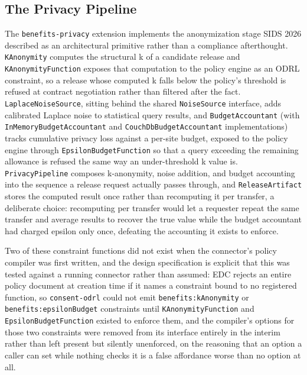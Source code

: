 \subsection{The Privacy Pipeline}

The \texttt{benefits-privacy} extension implements the anonymization stage SIDS 2026 described as an architectural primitive rather than a compliance afterthought. \texttt{KAnonymity} computes the structural k of a candidate release and \texttt{KAnonymityFunction} exposes that computation to the policy engine as an ODRL constraint, so a release whose computed k falls below the policy's threshold is refused at contract negotiation rather than filtered after the fact. \texttt{LaplaceNoiseSource}, sitting behind the shared \texttt{NoiseSource} interface, adds calibrated Laplace noise to statistical query results, and \texttt{BudgetAccountant} (with \texttt{InMemoryBudgetAccountant} and \texttt{CouchDbBudgetAccountant} implementations) tracks cumulative privacy loss against a per-site budget, exposed to the policy engine through \texttt{EpsilonBudgetFunction} so that a query exceeding the remaining allowance is refused the same way an under-threshold k value is. \texttt{PrivacyPipeline} composes k-anonymity, noise addition, and budget accounting into the sequence a release request actually passes through, and \texttt{ReleaseArtifact} stores the computed result once rather than recomputing it per transfer, a deliberate choice: recomputing per transfer would let a requester repeat the same transfer and average results to recover the true value while the budget accountant had charged epsilon only once, defeating the accounting it exists to enforce.

Two of these constraint functions did not exist when the connector's policy compiler was first written, and the design specification is explicit that this was tested against a running connector rather than assumed: EDC rejects an entire policy document at creation time if it names a constraint bound to no registered function, so \texttt{consent-odrl} could not emit \texttt{benefits:kAnonymity} or \texttt{benefits:epsilonBudget} constraints until \texttt{KAnonymityFunction} and \texttt{EpsilonBudgetFunction} existed to enforce them, and the compiler's options for those two constraints were removed from its interface entirely in the interim rather than left present but silently unenforced, on the reasoning that an option a caller can set while nothing checks it is a false affordance worse than no option at all.

